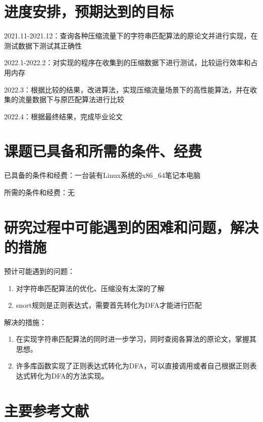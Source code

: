 \section{进度安排，预期达到的目标}

2021.11-2021.12：查询各种压缩流量下的字符串匹配算法的原论文并进行实现，在测试数据下测试其正确性

2022.1-2022.2：对实现的程序在收集到的压缩数据下进行测试，比较运行效率和占用内存

2022.3：根据比较的结果，改进算法，实现压缩流量场景下的高性能算法，并在收集的流量数据下与原匹配算法进行比较

2022.4：根据最终结果，完成毕业论文

\section{课题已具备和所需的条件、经费}

已具备的条件和经费：一台装有Linux系统的x86\_64笔记本电脑

所需的条件和经费：无


\section{研究过程中可能遇到的困难和问题，解决的措施}

预计可能遇到的问题：
\begin{enumerate}
  \item 对字符串匹配算法的优化、压缩没有太深的了解
  \item snort规则是正则表达式，需要首先转化为DFA才能进行匹配
\end{enumerate}

解决的措施：
\begin{enumerate}
  \item 在实现字符串匹配算法的同时进一步学习，同时查阅各算法的原论文，掌握其思想。
  \item 许多库函数实现了正则表达式转化为DFA，可以直接调用或者自己根据正则表达式转化为DFA的方法\cite{张树壮2011面向网络安全的正则表达式匹配技术}实现。
\end{enumerate}


\section{主要参考文献}




